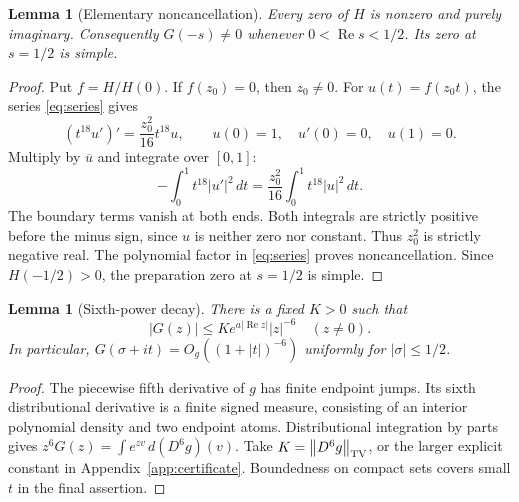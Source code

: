 \documentclass[11pt]{article}
\newtheorem{lemma}[theorem]{Lemma}
\theoremstyle{remark}
\newcommand{\dd}{\,d}
\newcommand{\Rea}{\operatorname{Re}}
\newcommand{\norm}[1]{\left\|#1\right\|}
\numberwithin{equation}{section}
\begin{document}
\begin{lemma}[Elementary noncancellation]\label{lem:noncancel}
Every zero of $H$ is nonzero and purely imaginary. Consequently
$G(-s)\ne0$ whenever $0<\Rea s<1/2$. Its zero at $s=1/2$ is simple.
\end{lemma}
\begin{proof}
Put $f=H/H(0)$. If $f(z_0)=0$, then $z_0\ne0$. For
$u(t)=f(z_0t)$, the series \eqref{eq:series} gives
\[
(t^{18}u')'=\frac{z_0^2}{16}t^{18}u,\qquad
u(0)=1,\quad u'(0)=0,\quad u(1)=0.
\]
Multiply by $\overline u$ and integrate over $[0,1]$:
\[
-\int_0^1t^{18}|u'|^2\dd t
=\frac{z_0^2}{16}\int_0^1t^{18}|u|^2\dd t.
\]
The boundary terms vanish at both ends. Both integrals are strictly
positive before the minus sign, since $u$ is neither zero nor constant.
Thus $z_0^2$ is strictly negative real. The polynomial factor in
\eqref{eq:series} proves noncancellation. Since $H(-1/2)>0$,
the preparation zero at $s=1/2$ is simple.
\end{proof}

\begin{lemma}[Sixth-power decay]\label{lem:decay}
There is a fixed $K>0$ such that
\begin{equation}\label{eq:decay}
|G(z)|\le K e^{a|\Rea z|}|z|^{-6}\quad(z\ne0).
\end{equation}
In particular, $G(\sigma+it)=O_g((1+|t|)^{-6})$ uniformly for
$|\sigma|\le1/2$.
\end{lemma}
\begin{proof}
The piecewise fifth derivative of $g$ has finite endpoint jumps.
Its sixth distributional derivative is a finite signed measure,
consisting of an interior polynomial density and two endpoint atoms.
Distributional integration by parts gives
$z^6G(z)=\int e^{zv}\dd(D^6g)(v)$.
Take $K=\norm{D^6g}_{\rm TV}$, or the larger explicit constant in
Appendix~\ref{app:certificate}. Boundedness on compact sets covers
small $t$ in the final assertion.
\end{proof}
\end{document}
